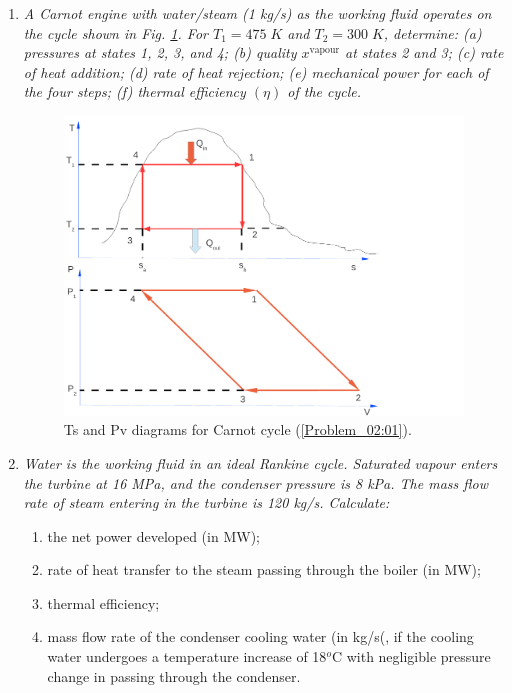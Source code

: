\documentclass[12pts,a4paper,amsmath,amssymb,floatfix]{article}%
\begin{document}
\begin{enumerate}[label=\bfseries Problem \arabic*]
\item \label{Problem_02:01}{\it A Carnot engine with water/steam (1 kg/s) as the working fluid operates on the cycle shown in Fig. \ref{PVTSDiags}. For $T_{1}=475\;K$ and $T_{2}=300\;K$, determine: (a) pressures at states 1, 2, 3, and 4; (b) quality $x^{\text{vapour}}$ at states 2 and 3; (c) rate of heat addition; (d) rate of heat rejection; (e) mechanical power for each of the four steps; (f) thermal efficiency $\left(\eta\right)$ of the cycle.}
   \begin{figure}[h]
    \begin{center}
     \includegraphics[width=12.cm,clip]{./../../ThermalEngines/Pics/Carnot_PV_TS}
    \end{center}
    \caption{Ts and Pv diagrams for Carnot cycle (\ref{Problem_02:01}).}\label{PVTSDiags}
   \end{figure}    


\item {\it Water is the working fluid in an ideal Rankine cycle. Saturated vapour enters the turbine at 16 MPa, and the condenser pressure is 8 kPa. The mass flow rate of steam entering in the turbine is 120 kg/s. Calculate:
\begin{enumerate}
\item the net power developed (in MW);
\item rate of heat transfer to the steam passing through the boiler (in MW);
\item thermal efficiency;
\item mass flow rate of the condenser cooling water (in kg/s(, if the cooling water undergoes a temperature increase of 18$^{o}$C with negligible pressure change in passing through the condenser.
\end{enumerate} 
}



\end{enumerate}
\end{document}
